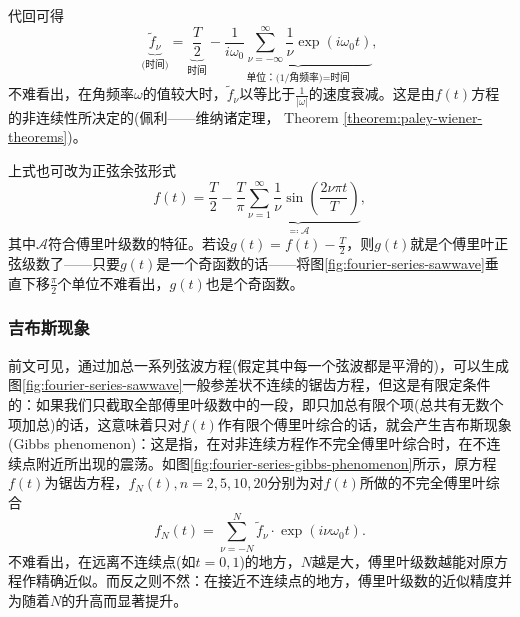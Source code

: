 代回可得
\begin{equation*}
    \underbrace{
    \tilde{f}_{\nu}
    }_{\text{(时间)}} =
    \underbrace{
    \frac{T}{2}
    }_{\text{时间}}
     - \underbrace{
     \frac{1}{i \omega_{0}} \sum_{\nu = - \infty}^{\infty} \frac{1}{\nu} \exp \left( i \omega_{0} t \right)
     }_{\text{单位：(1/角频率)=时间}},
\end{equation*}
不难看出，在角频率$\omega$的值较大时，$\tilde{f}_{\nu}$以等比于$\frac{1}{\left| \omega \right|}$的速度衰减。这是由$f(t)$方程的非连续性所决定的(佩利——维纳诸定理， Theorem \ref{theorem:paley-wiener-theorems})。

上式也可改为正弦余弦形式
\begin{equation}
  \label{eq:fourier-series-sin-coef-sincos}
  f(t) = \frac{T}{2} - \underbrace{
  \frac{T}{\pi} \sum_{\nu = 1}^{\infty} \frac{1}{\nu}
  \sin \left(
  \frac{2 \nu \pi t}{T}
  \right)
  }_{\eqqcolon \mathcal{A}},
\end{equation}
其中$\mathcal{A}$符合傅里叶级数的特征。若设$g(t) = f(t) - \frac{T}{2}$，则$g(t)$就是个傅里叶正弦级数了——只要$g(t)$是一个奇函数的话——将图\ref{fig:fourier-series-sawwave}垂直下移$\frac{\pi}{2}$个单位不难看出，$g(t)$也是个奇函数。

\subsubsection{吉布斯现象}
\label{sec:fourier-series-gibbs-phenomenon}
前文可见，通过加总一系列弦波方程(假定其中每一个弦波都是平滑的)，可以生成图\ref{fig:fourier-series-sawwave}一般参差状不连续的锯齿方程，但这是有限定条件的：如果我们只截取全部傅里叶级数中的一段，即只加总有限个项(总共有无数个项加总)的话，这意味着只对$f(t)$作有限个傅里叶综合的话，就会产生吉布斯现象(Gibbs phenomenon)：这是指，在对非连续方程作不完全傅里叶综合时，在不连续点附近所出现的震荡。如图\ref{fig:fourier-series-gibbs-phenomenon}所示，原方程$f(t)$为锯齿方程，$f_{N}(t), n=2,5,10,20$分别为对$f(t)$所做的不完全傅里叶综合
\begin{equation*}
  f_{N}(t) = \sum_{\nu = - N}^{N} \tilde{f}_{\nu} \cdot \exp \left( i \nu \omega_{0} t \right).
\end{equation*}
不难看出，在远离不连续点(如$t=0,1$)的地方，$N$越是大，傅里叶级数越能对原方程作精确近似。而反之则不然：在接近不连续点的地方，傅里叶级数的近似精度并为随着$N$的升高而显著提升。

